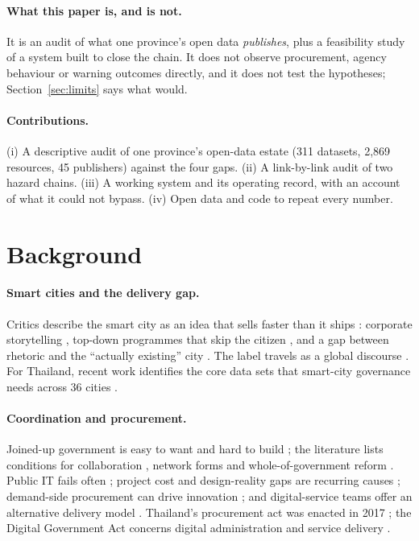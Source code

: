 \documentclass[10pt,twocolumn,a4paper]{article}
\begin{document}
\paragraph{What this paper is, and is not.} It is an audit of what one province's open data \emph{publishes}, plus a feasibility study of a system built to close the chain. It does not observe procurement, agency behaviour or warning outcomes directly, and it does not test the hypotheses; Section~\ref{sec:limits} says what would.
\paragraph{Contributions.} (i) A descriptive audit of one province's open-data estate (311 datasets, 2{,}869 resources, 45 publishers) against the four gaps. (ii) A link-by-link audit of two hazard chains. (iii) A working system and its operating record, with an account of what it could not bypass. (iv) Open data and code to repeat every number.

\section{Background}
\paragraph{Smart cities and the delivery gap.}
Critics describe the smart city as an idea that sells faster than it ships \citep{hollands2008,townsend2013smart,greenfield2013against}: corporate storytelling \citep{soderstrom2014,wiig2015}, top-down programmes that skip the citizen \citep{datta2015,cardullo2019}, and a gap between rhetoric and the ``actually existing'' city \citep{shelton2015}. The label travels as a global discourse \citep{joss2019}. For Thailand, recent work identifies the core data sets that smart-city governance needs across 36 cities \citep{ruangwicha2026}.

\paragraph{Coordination and procurement.}
Joined-up government is easy to want and hard to build \citep{pollitt2003,bardach1998}; the literature lists conditions for collaboration \citep{bryson2006,ansell2008}, network forms \citep{provan2008} and whole-of-government reform \citep{christensen2007}. Public IT fails often \citep{goldfinch2007,anthopoulos2016}; project cost and design-reality gaps are recurring causes \citep{flyvbjerg2013,heeks2006}; demand-side procurement can drive innovation \citep{edler2007}; and digital-service teams offer an alternative delivery model \citep{mergel2019,pahlka2023}. Thailand's procurement act was enacted in 2017 \citep{thailand2017procurementact}; the Digital Government Act concerns digital administration and service delivery \citep{thailand2019digitalact}.
\end{document}
